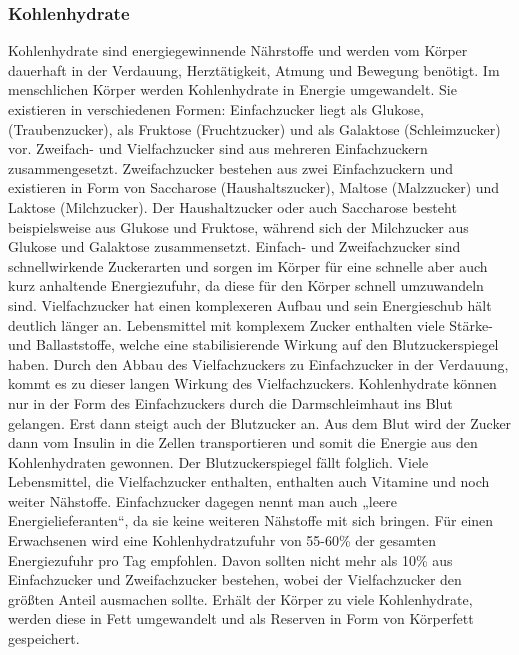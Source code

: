 	\subsubsection{Kohlenhydrate}
		Kohlenhydrate sind energiegewinnende Nährstoffe und werden vom Körper dauerhaft in der Verdauung, Herztätigkeit, Atmung und Bewegung benötigt.\cite{SG} Im menschlichen Körper werden Kohlenhydrate in Energie umgewandelt. Sie existieren in verschiedenen Formen: Einfachzucker liegt als Glukose, (Traubenzucker), als Fruktose (Fruchtzucker) und als Galaktose (Schleimzucker) vor. Zweifach- und Vielfachzucker sind aus mehreren Einfachzuckern zusammengesetzt. Zweifachzucker bestehen aus zwei Einfachzuckern und existieren in Form von Saccharose (Haushaltszucker), Maltose (Malzzucker) und Laktose (Milchzucker).\cite{ND} Der Haushaltzucker oder auch Saccharose besteht beispielsweise aus Glukose und Fruktose, während sich der Milchzucker aus Glukose und Galaktose zusammensetzt.\cite{SG} Einfach- und Zweifachzucker sind schnellwirkende Zuckerarten und sorgen im Körper für eine schnelle aber auch kurz anhaltende Energiezufuhr, da diese für den Körper schnell umzuwandeln sind. Vielfachzucker hat einen komplexeren Aufbau und sein Energieschub hält deutlich länger an. Lebensmittel mit komplexem Zucker enthalten viele Stärke- und Ballaststoffe, welche eine stabilisierende Wirkung auf den Blutzuckerspiegel haben. Durch den Abbau des Vielfachzuckers zu Einfachzucker in der Verdauung, kommt es zu dieser langen Wirkung des Vielfachzuckers.\cite{ND} Kohlenhydrate können nur in der Form des Einfachzuckers durch die Darmschleimhaut ins Blut gelangen. Erst dann steigt auch der Blutzucker an. Aus dem Blut wird der Zucker dann vom Insulin in die Zellen transportieren und somit die Energie aus den Kohlenhydraten gewonnen. Der Blutzuckerspiegel fällt folglich.\cite{SG} \newline
		Viele Lebensmittel, die Vielfachzucker enthalten, enthalten auch Vitamine und noch weiter Nähstoffe. Einfachzucker dagegen nennt man auch „leere Energielieferanten“, da sie keine weiteren Nähstoffe mit sich bringen. Für einen Erwachsenen wird eine Kohlenhydratzufuhr von 55-60\% der gesamten Energiezufuhr pro Tag empfohlen. Davon sollten nicht mehr als 10\% aus Einfachzucker und Zweifachzucker bestehen, wobei der Vielfachzucker den größten Anteil ausmachen sollte. \newline
		Erhält der Körper zu viele Kohlenhydrate, werden diese in Fett umgewandelt und als Reserven in Form von Körperfett gespeichert.\cite{ND} \newline
